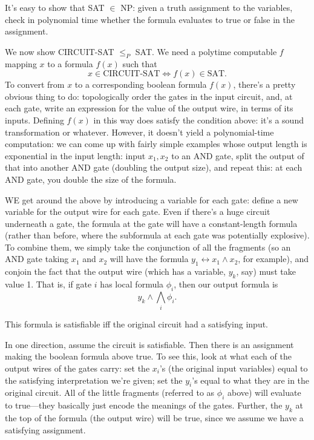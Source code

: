 \documentclass{article}
\begin{document}
It's easy to show that SAT $\in$ NP: given a truth assignment to the variables,
check in polynomial time whether the formula evaluates to true or false
in the assignment.

We now show CIRCUIT-SAT $\leq_P$ SAT. We need a polytime computable $f$
mapping $x$ to a formula $f(x)$ such that
$$
x\in \textrm{CIRCUIT-SAT} \Leftrightarrow
f(x) \in \textrm{SAT}.
$$
To convert from $x$ to a corresponding boolean formula $f(x)$, there's a 
pretty obvious thing to do: topologically order the gates in the input
circuit, and, at each gate, write an expression for the value of the output
wire, in terms of its inputs.
Defining $f(x)$ in this way does satisfy the condition above: it's
a sound transformation or whatever.
However, it doesn't yield a polynomial-time computation: we can come up with
fairly simple examples whose output length is exponential in the input length:
input $x_1, x_2$ to an AND gate, split the output of that into another
AND gate (doubling the output size), and repeat this: at each AND gate, you
double the size of the formula.

WE get around the above by introducing a variable for each gate: define
a new variable for the output wire for each gate. Even if there's a huge
circuit underneath a gate, the formula at the gate will have a constant-length
formula (rather than before, where the subformula at each gate was potentially
explosive).
To combine them, we simply take the conjunction of all the fragments (so
an AND gate taking $x_1$ and $x_2$ will have the formula $y_1 \leftrightarrow
x_1 \wedge x_2$, for example), and conjoin the fact that the output wire
(which has a variable, $y_k$, say) must take value 1.
That is, if gate $i$ has local formula $\phi_i$, then our output formula is
$$
y_k \wedge \bigwedge_i \phi_i.
$$

This formula is satisfiable iff the original circuit had a satisfying input.

In one direction, assume the circuit is satisfiable. Then there is an 
assignment making the boolean formula above true. To see this, look at
what each of the output wires of the gates carry: set the $x_i$'s (the
original input variables) equal to the satisfying interpretation we're given;
set the $y_i$'s equal to what they are in the original circuit. All of the
little fragments (referred to as $\phi_i$ above) will evaluate to true---they
basically just encode the meanings of the gates. Further, the $y_k$ at the
top of the formula (the output wire) will be true, since we assume we
have a satisfying assignment.
\end{document}
